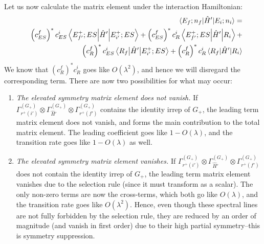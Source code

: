 \documentclass[12pt]{article}
\begin{document}
	Let us now calculate the matrix element under the interaction Hamiltonian:
	\begin{eqnarray*}
	&&\mel{E_f;n_f}{\hat{H}'}{E_i;n_i}=\\
	&&\left(c_{ES}^f\right)^* c_{ES}^i \mel{E_{f'}^+;ES}{\hat{H}'}{E_{i'}^+;ES}+\left(c_{ES}^f\right)^* c_R^i \mel{E_{f'}^+;ES}{\hat{H}'}{R_i} + \\
	&&\left(c_{R}^f\right)^* c_{ES}^i\mel{R_f}{\hat{H}'}{E_{i'}^+;ES} + \left(c_{R}^f\right)^* c_R^i \mel{R_f}{\hat{H}'}{R_i}
	\end{eqnarray*}
	We know that $\left(c_{R}^f\right)^* c_R^i$ goes like $O\left(\lambda^2\right)$, and hence we will disregard the corresponding term. There are now two possibilities for what may occur:
	\begin{enumerate}
	\item \textit{The elevated symmetry matrix element does not vanish.} If $\Gamma^{\left(G_+\right)}_{r^+(i')}\otimes \Gamma^{\left(G_+\right)}_{\hat{H}'}\otimes \Gamma^{\left(G_+\right)}_{r^+(f')}$ contains the identity irrep of $G_+$, the leading term matrix element does not vanish, and forms the main contribution to the total matrix element. The leading coefficient goes like $1-O(\lambda)$, and the transition rate goes like $1-O(\lambda)$ as well.
	\item \textit{The elevated symmetry matrix element vanishes.} If $\Gamma^{\left(G_+\right)}_{r^+(i')}\otimes \Gamma^{\left(G_+\right)}_{\hat{H}'}\otimes \Gamma^{\left(G_+\right)}_{r^+(f')}$ does not contain the identity irrep of $G_+$, the leading term matrix element vanishes due to the selection rule (since it must transform as a scalar). The only non-zero terms are now the cross-terms, which both go like $O(\lambda)$, and the transition rate goes like $O(\lambda^2)$. Hence, even though these spectral lines are not fully forbidden by the selection rule, they are reduced by an order of magnitude (and vanish in first order) due to their high partial symmetry--this is symmetry suppression.
	\end{enumerate}
	
\end{document}
